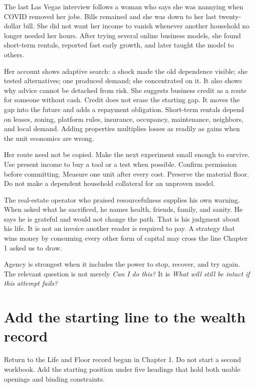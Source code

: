 The last Las Vegas interview follows a woman who says she was nannying when
COVID removed her jobs. Bills remained and she was down to her last
twenty-dollar bill. She did not want her income to vanish whenever another household
no longer needed her hours. After trying several online business models, she
found short-term rentals, reported fast early growth, and later taught the
model to others.

Her account shows adaptive search: a shock made the old dependence visible;
she tested alternatives; one produced demand; she concentrated on it. It also
shows why advice cannot be detached from risk. She suggests business credit as
a route for someone without cash. Credit does not erase the starting gap. It
moves the gap into the future and adds a repayment obligation. Short-term
rentals depend on leases, zoning, platform rules, insurance, occupancy,
maintenance, neighbors, and local demand. Adding properties multiplies losses
as readily as gains when the unit economics are wrong.

Her route need not be copied. Make the next experiment small enough to survive.
Use present income
to buy a tool or a test when possible. Confirm permission before committing.
Measure one unit after every cost. Preserve the material floor. Do not make a
dependent household collateral for an unproven model.

The real-estate operator who praised resourcefulness supplies his own warning.
When asked what he sacrificed, he names health, friends, family, and sanity. He
says he is grateful and would not change the path. That is his judgment about
his life. It is not an invoice another reader is required to pay. A strategy
that wins money by consuming every other form of capital may cross the line
Chapter 1 asked us to draw.

Agency is strongest when it includes the power to stop, recover, and try again.
The relevant question is not merely \emph{Can I do this?} It is \emph{What will
still be intact if this attempt fails?}

\section{Add the starting line to the wealth record}

Return to the Life and Floor record begun in Chapter 1. Do not start a second
workbook. Add the starting position under five headings that hold both usable
openings and binding constraints.

